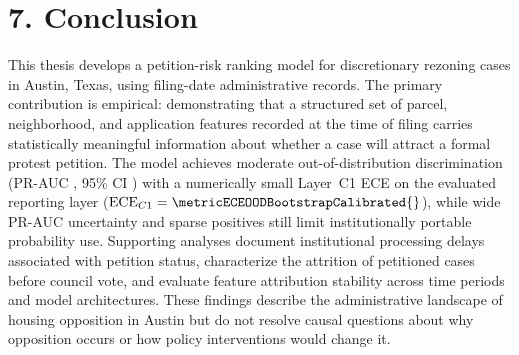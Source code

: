 \section*{7. Conclusion}
This thesis develops a petition-risk ranking model for discretionary rezoning cases in Austin, Texas, using filing-date administrative records. The primary contribution is empirical: demonstrating that a structured set of parcel, neighborhood, and application features recorded at the time of filing carries statistically meaningful information about whether a case will attract a formal protest petition. The model achieves moderate out-of-distribution discrimination (PR-AUC \metricBootstrapFiling{}, 95\% CI \metricBootstrapFilingCI{}) with a numerically small Layer~C1 ECE on the evaluated reporting layer ($\text{ECE}_{C1}=\metricECEOODBootstrapCalibrated{}$), while wide PR-AUC uncertainty and sparse positives still limit institutionally portable probability use. Supporting analyses document institutional processing delays associated with petition status, characterize the attrition of petitioned cases before council vote, and evaluate feature attribution stability across time periods and model architectures. These findings describe the administrative landscape of housing opposition in Austin but do not resolve causal questions about why opposition occurs or how policy interventions would change it.
